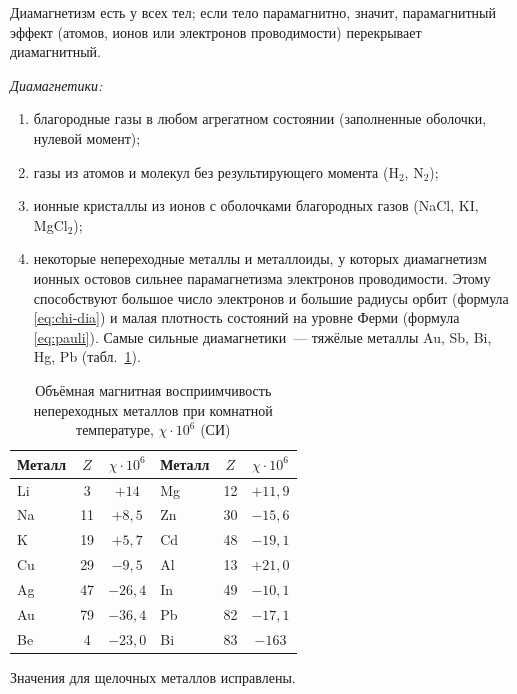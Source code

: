 Диамагнетизм есть у всех тел; если тело парамагнитно, значит,
парамагнитный эффект (атомов, ионов или электронов проводимости)
перекрывает диамагнитный.

\emph{Диамагнетики:}
\begin{enumerate}
\item благородные газы в любом агрегатном состоянии (заполненные
оболочки, нулевой момент);
\item газы из атомов и молекул без результирующего момента (H$_2$, N$_2$);
\item ионные кристаллы из ионов с оболочками благородных газов (NaCl,
KI, MgCl$_2$);
\item некоторые непереходные металлы и металлоиды, у которых диамагнетизм
ионных остовов сильнее парамагнетизма электронов проводимости. Этому
способствуют большое число электронов и большие радиусы орбит
(формула \eqref{eq:chi-dia}) и малая плотность состояний на уровне Ферми
(формула \eqref{eq:pauli}). Самые сильные диамагнетики~— тяжёлые
металлы Au, Sb, Bi, Hg, Pb (табл.~\ref{tab:chi-metals}).
\end{enumerate}

\begin{table}[ht]
\centering
\caption{Объёмная магнитная восприимчивость непереходных металлов при
комнатной температуре, $\chi\cdot10^6$ (СИ)}
\label{tab:chi-metals}
\small
\begin{tabular}{@{}lcc@{\qquad}lcc@{}}
\toprule
Металл & $Z$ & $\chi\cdot10^6$ & Металл & $Z$ & $\chi\cdot10^6$ \\
\midrule
Li & 3 & $+14$ & Mg & 12 & $+11{,}9$ \\
Na & 11 & $+8{,}5$ & Zn & 30 & $-15{,}6$ \\
K & 19 & $+5{,}7$ & Cd & 48 & $-19{,}1$ \\
Cu & 29 & $-9{,}5$ & Al & 13 & $+21{,}0$ \\
Ag & 47 & $-26{,}4$ & In & 49 & $-10{,}1$ \\
Au & 79 & $-36{,}4$ & Pb & 82 & $-17{,}1$ \\
Be & 4 & $-23{,}0$ & Bi & 83 & $-163$ \\
\bottomrule
\end{tabular}
\end{table}
\noindent Значения для щелочных металлов исправлены.

